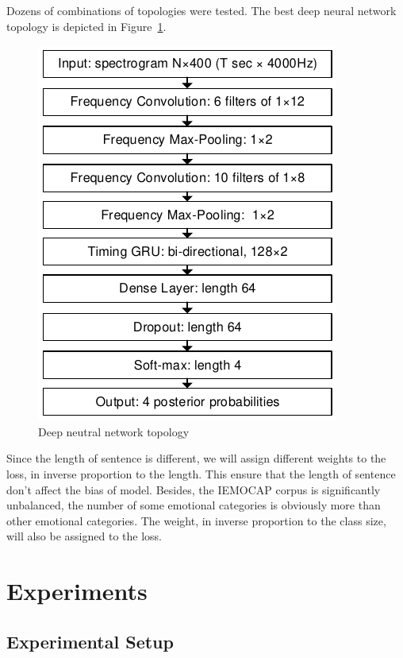 \documentclass[a4paper]{article}
\begin{document}
Dozens of combinations of topologies were tested. The best deep neural network topology is depicted in Figure~\ref{fig:network}.

\begin{figure}[!htb]
\centering
\centerline{\includegraphics{network}}
\caption{Deep neutral network topology}
\label{fig:network}
\end{figure}

Since the length of sentence is different, we will assign different weights to the loss, in inverse proportion to the length. This ensure that the length of sentence don't affect the bias of model. Besides, the IEMOCAP corpus is significantly unbalanced, the number of some emotional categories is obviously more than other emotional categories. The weight, in inverse proportion to the class size, will also be assigned to the loss.

\section{Experiments}
\label{sec:experiments}

\subsection{Experimental Setup}
\label{ssec:experimental setup}
\end{document}
